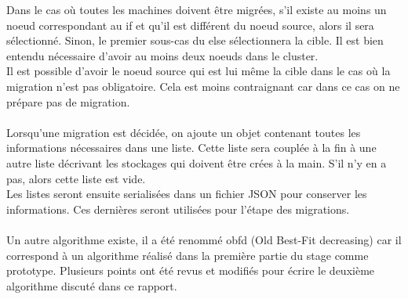 \documentclass[14pt]{extarticle}
\begin{document}
\begin{itemize}[nosep,label=\textendash]
        Dans le cas où toutes les machines doivent être migrées, s'il existe au moins un noeud correspondant au if et qu'il est différent du noeud source, alors il sera sélectionné. Sinon, le premier sous-cas du else sélectionnera la cible. Il est bien entendu nécessaire d'avoir au moins deux noeuds dans le cluster.\\
        Il est possible d'avoir le noeud source qui est lui même la cible dans le cas où la migration n'est pas obligatoire. Cela est moins contraignant car dans ce cas on ne prépare pas de migration.\\
        \\
        Lorsqu'une migration est décidée, on ajoute un objet contenant toutes les informations nécessaires dans une liste. Cette liste sera couplée à la fin à une autre liste décrivant les stockages qui doivent être crées à la main. S'il n'y en a pas, alors cette liste est vide.\\
        Les listes seront ensuite serialisées dans un fichier JSON pour conserver les informations. Ces dernières seront utilisées pour l'étape des migrations.\\
        \\
        Un autre algorithme existe, il a été renommé obfd (Old Best-Fit decreasing) car il correspond à un algorithme réalisé dans la première partie du stage comme prototype. Plusieurs points ont été revus et modifiés pour écrire le deuxième algorithme discuté dans ce rapport.
    \end{itemize}
    \newpage
\end{document}
